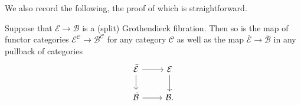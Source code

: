 \documentclass[a4paper,10pt]{article}%
\begin{document}



We also record the following, the proof of which is straightforward.
\begin{proposition}\label{GROTHSTAB PROP}
	Suppose that $\mathcal{E} \to \mathcal{B}$ is a (split) Grothendieck fibration. Then so is the map of functor categories 
	$\mathcal{E}^{\mathcal{C}} \to \mathcal{B}^{\mathcal{C}}$ for any category $\mathcal{C}$ as well as the map 
	$\bar{\mathcal{E}} \to \bar{\mathcal{B}}$ in any pullback of categories
\[
\begin{tikzcd}
	\bar{\mathcal{E}} \ar{r} \ar{d} & \mathcal{E} \ar{d}
\\
	\bar{\mathcal{B}} \ar{r} & \mathcal{B}.
\end{tikzcd}
\]	
\end{proposition}
\end{document}
